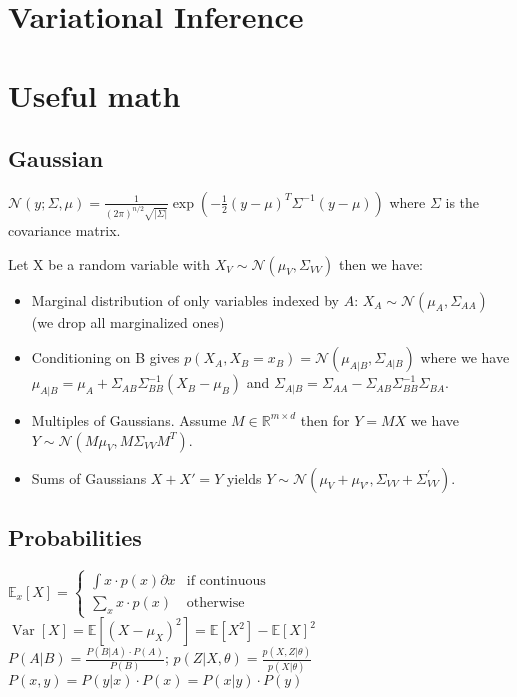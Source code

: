 \documentclass[11pt]{article}
\newcommand{\gauss}{\mathcal{N}}
\begin{document}
\begin{multicols*}{3}
	
	\section*{Variational Inference}
	
	
	
	\section*{Useful math}
	\subsection*{Gaussian}
	$\gauss(y;\Sigma,\mu) = \frac{1}{(2\pi)^{n/2} \sqrt{|\Sigma|}} \exp \left( - \frac{1}{2} (y-\mu)^T \Sigma^{-1}(y-\mu) \right) $ where $\Sigma$ is the covariance matrix.
	
	Let X be a random variable with $X_V \sim \gauss(\mu_V,\Sigma_{VV})$ then we have:
	\begin{itemize}
		\item Marginal distribution of only variables indexed by $A$: $X_A \sim \gauss(\mu_A,\Sigma_{AA})$ (we drop all marginalized ones)
		\item Conditioning on B gives $p(X_A,X_B = x_B) = \gauss(\mu_{A|B},\Sigma_{A|B})$ where we have $\mu_{A|B} = \mu_A + \Sigma_{AB}\Sigma_{BB}^{-1}(X_B - \mu_B)$ and $\Sigma_{A|B} = \Sigma_{AA} - \Sigma_{AB}\Sigma_{BB}^{-1}\Sigma_{BA}$.
		\item Multiples of Gaussians. Assume $M\in \mathbb{R}^{m\times d}$ then for $Y=MX$ we have $Y\sim \gauss (M\mu_V,M\Sigma_{VV}M^T)$.
		\item Sums of Gaussians $X+X'=Y$ yields $Y\sim \gauss (\mu_V + \mu_{V'} ,\Sigma_{VV} + \Sigma^{'}_{VV})$.
	\end{itemize}

	
	\subsection*{Probabilities}
	$\mathbb{E}_x[X] = \begin{cases}
		\int x \cdot p(x) \partial x  & \text{if continuous}\\
		\sum_x x \cdot p(x) & \text{otherwise}
	\end{cases}$\\
	$\operatorname{Var}[X] = \mathbb{E}[(X-\mu_X)^2] = \mathbb{E}[X^2] - \mathbb{E}[X]^2$\\
	$P(A|B) = \frac{P(B|A) \cdot P(A)}{P(B)}$; $p(Z|X,\theta) = \frac{p(X,Z|\theta)}{p(X|\theta)}$\\
	$P(x,y) = P(y|x) \cdot  P(x) = P(x|y) \cdot P(y)$
	

\end{multicols*}
\end{document}
